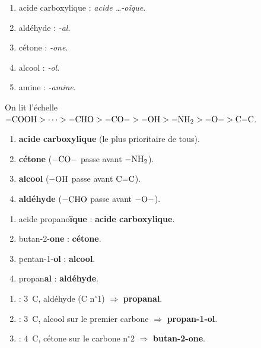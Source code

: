 \documentclass[11pt,a4paper]{article}
\begin{document}
\begin{corrige}
\begin{enumerate}[label=\alph*)]
  \item acide carboxylique : \textit{acide \dots-oïque}.
  \item aldéhyde : \textit{-al}.
  \item cétone : \textit{-one}.
  \item alcool : \textit{-ol}.
  \item amine : \textit{-amine}.
\end{enumerate}
\end{corrige}

\begin{corrige}
On lit l'échelle $-\ce{COOH} > \dots > -\ce{CHO} > -\ce{CO}- > -\ce{OH} > -\ce{NH2} > -\ce{O}- > \ce{C=C}$.
\begin{enumerate}[label=\alph*)]
  \item \textbf{acide carboxylique} (le plus prioritaire de tous).
  \item \textbf{cétone} ($-\ce{CO}-$ passe avant $-\ce{NH2}$).
  \item \textbf{alcool} ($-\ce{OH}$ passe avant $\ce{C=C}$).
  \item \textbf{aldéhyde} ($-\ce{CHO}$ passe avant $-\ce{O}-$).
\end{enumerate}
\end{corrige}

\begin{corrige}
\begin{enumerate}[label=\alph*)]
  \item acide propano\textbf{ïque} : \textbf{acide carboxylique}.
  \item butan-2-\textbf{one} : \textbf{cétone}.
  \item pentan-1-\textbf{ol} : \textbf{alcool}.
  \item propan\textbf{al} : \textbf{aldéhyde}.
\end{enumerate}
\end{corrige}

\begin{corrige}
\begin{enumerate}[label=\alph*)]
  \item {} : $3$~C, aldéhyde (C n$^\circ$1) $\Rightarrow$ \textbf{propanal}.
  \item {} : $3$~C, alcool sur le premier carbone $\Rightarrow$ \textbf{propan-1-ol}.
  \item {} : $4$~C, cétone sur le carbone n$^\circ$2 $\Rightarrow$ \textbf{butan-2-one}.
\end{enumerate}
\end{corrige}
\end{document}
